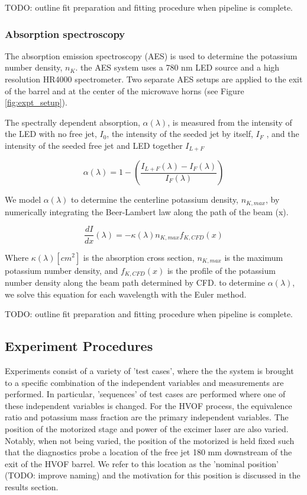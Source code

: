 TODO: outline fit preparation and fitting procedure when pipeline is complete.

\subsubsection{Absorption spectroscopy}

The absorption emission spectroscopy (AES) is used to determine the potassium number density, $n_K$. the AES system uses a 780 nm LED source and a high resolution HR4000 spectrometer. Two separate AES setups are applied to the exit of the barrel and at the center of the microwave horns (see Figure \ref{fig:expt_setup}).

The spectrally dependent absorption, $\alpha(\lambda)$, is measured from the intensity of the LED with no free jet, $I_0$, the intensity of the seeded jet by itself, $I_F$ , and the intensity of the seeded free jet and LED together $I_{L+F}$


\begin{equation}
    \alpha(\lambda) = 1 - \left(\frac{I_{L+F}(\lambda) - I_{F}(\lambda)}{I_F(\lambda)}\right)
\end{equation}


We model $\alpha(\lambda)$ to determine the centerline potassium density, $n_{K, max}$, by numerically integrating the Beer-Lambert law along the path of the beam (x).

\begin{equation}
    \frac{dI}{dx}(\lambda) = -\kappa(\lambda) n_{K,max} f_{K, CFD}(x)
\end{equation}

Where $\kappa(\lambda) [cm^2]$ is the absorption cross section, $n_{K,max}$ is the maximum potassium number density, and $f_{K, CFD}(x)$ is the profile of the potassium number density along the beam path determined by CFD. to determine $\alpha(\lambda)$, we solve this equation for each wavelength with the Euler method.  

TODO: outline fit preparation and fitting procedure when pipeline is complete.

\subsection{Experiment Procedures}

Experiments consist of a variety of 'test cases', where the the system is brought to a specific combination of the independent variables and measurements are performed. In particular, 'sequences' of test cases are performed where one of these independent variables is changed. For the HVOF process, the equivalence ratio and potassium mass fraction are the primary independent variables. The position of the motorized stage and power of the excimer laser are also varied. Notably, when not being varied, the position of the motorized is held fixed such that the diagnostics probe a location of the free jet 180 mm downstream of the exit of the HVOF barrel. We refer to this location as the 'nominal position' (TODO: improve naming) and the motivation for this position is discussed in the results section.  

